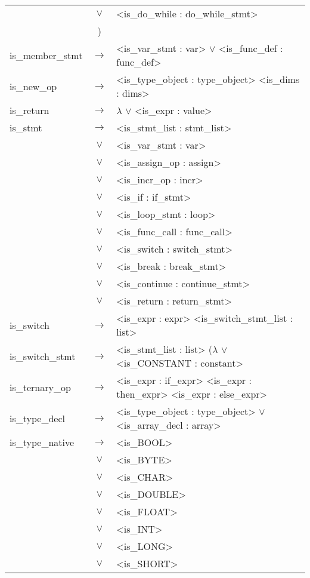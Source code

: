 \documentclass[a4paper]{article}
\begin{document}
\begin{longtable}{lcl}
								& $\vee$ & <is\_do\_while : do\_while\_stmt> \\
								& ) & \\
	is\_member\_stmt			& $\to$ & <is\_var\_stmt : var> $\vee$ <is\_func\_def : func\_def> \\
	is\_new\_op					& $\to$ & <is\_type\_object : type\_object> <is\_dims : dims> \\
	is\_return					& $\to$ & $\lambda$ $\vee$ <is\_expr : value> \\
	is\_stmt					& $\to$ & <is\_stmt\_list : stmt\_list> \\
								& $\vee$ & <is\_var\_stmt : var> \\
								& $\vee$ & <is\_assign\_op : assign> \\
								& $\vee$ & <is\_incr\_op : incr> \\
								& $\vee$ & <is\_if : if\_stmt> \\
								& $\vee$ & <is\_loop\_stmt : loop> \\
								& $\vee$ & <is\_func\_call : func\_call> \\
								& $\vee$ & <is\_switch : switch\_stmt> \\
								& $\vee$ & <is\_break : break\_stmt> \\
								& $\vee$ & <is\_continue : continue\_stmt> \\
								& $\vee$ & <is\_return : return\_stmt> \\
	is\_switch					& $\to$ & <is\_expr : expr> <is\_switch\_stmt\_list : list> \\
	is\_switch\_stmt			& $\to$ & <is\_stmt\_list : list> ($\lambda$ $\vee$ <is\_CONSTANT : constant> \\
	is\_ternary\_op				& $\to$ & <is\_expr : if\_expr> <is\_expr : then\_expr> <is\_expr : else\_expr> \\
	is\_type\_decl				& $\to$ & <is\_type\_object : type\_object> $\vee$ <is\_array\_decl : array> \\
	is\_type\_native			& $\to$ & <is\_BOOL> \\
								& $\vee$ & <is\_BYTE> \\
								& $\vee$ & <is\_CHAR> \\
								& $\vee$ & <is\_DOUBLE> \\
								& $\vee$ & <is\_FLOAT> \\
								& $\vee$ & <is\_INT> \\
								& $\vee$ & <is\_LONG> \\
								& $\vee$ & <is\_SHORT> \\

\end{longtable}
\end{document}

